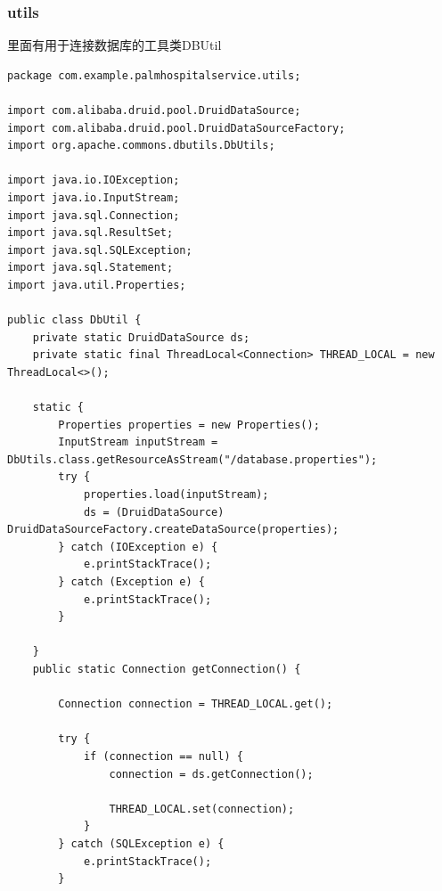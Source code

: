 \documentclass[UTF8,12pt]{article}
\begin{document}
\subsubsection{utils}
里面有用于连接数据库的工具类DBUtil

\begin{lstlisting}[frame=shadowbox]
package com.example.palmhospitalservice.utils;

import com.alibaba.druid.pool.DruidDataSource;
import com.alibaba.druid.pool.DruidDataSourceFactory;
import org.apache.commons.dbutils.DbUtils;

import java.io.IOException;
import java.io.InputStream;
import java.sql.Connection;
import java.sql.ResultSet;
import java.sql.SQLException;
import java.sql.Statement;
import java.util.Properties;

public class DbUtil {
    private static DruidDataSource ds;
    private static final ThreadLocal<Connection> THREAD_LOCAL = new ThreadLocal<>();

    static {
        Properties properties = new Properties();
        InputStream inputStream = DbUtils.class.getResourceAsStream("/database.properties");
        try {
            properties.load(inputStream);
            ds = (DruidDataSource) DruidDataSourceFactory.createDataSource(properties);
        } catch (IOException e) {
            e.printStackTrace();
        } catch (Exception e) {
            e.printStackTrace();
        }

    }
    public static Connection getConnection() {

        Connection connection = THREAD_LOCAL.get();

        try {
            if (connection == null) {
                connection = ds.getConnection();

                THREAD_LOCAL.set(connection);
            }
        } catch (SQLException e) {
            e.printStackTrace();
        }



\end{lstlisting}
\end{document}
